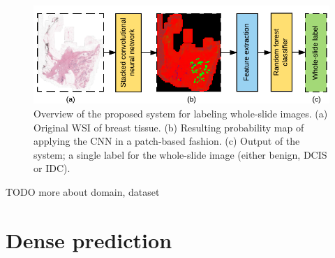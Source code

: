 \documentclass[journal]{IEEEtran}
\begin{document}
\begin{figure}[!t]
\centering
\hspace{-0.08in}\includegraphics[width=6in]{system_overview}%
\vspace{-0.1cm}\caption{Overview of the proposed system for labeling whole-slide images. (a) Original WSI of breast tissue. (b) Resulting probability map of applying the CNN in a patch-based fashion. (c) Output of the system; a single label for the whole-slide image (either benign, DCIS or IDC).}
\end{figure}








TODO more about domain, dataset




















\section{Dense prediction}
\end{document}
